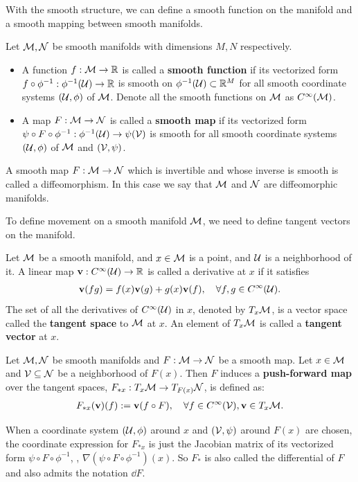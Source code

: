 With the smooth structure, we can define a smooth function on the manifold and a smooth mapping between smooth manifolds.
\begin{definition}
    Let $\mathcal{M},\mathcal{N}$ be smooth manifolds with dimensions $M,N$ respectively.
    \begin{itemize}
        \item A function $f:\mathcal{M}\to\mathbb{R}$ is called a \textbf{smooth function} if its vectorized form $f\circ\phi^{-1}:\phi^{-1}(\mathcal{U})\to\mathbb{R}$ is smooth on $\phi^{-1}(\mathcal{U})\subset\mathbb{R}^M$ for all smooth coordinate systems $(\mathcal{U},\phi)$ of $\mathcal{M}$. Denote all the smooth functions on $\mathcal{M}$ as $C^\infty(\mathcal{M})$.
        \item A map $F:\mathcal{M}\to\mathcal{N}$ is called a \textbf{smooth map} if its vectorized form $\psi\circ F\circ\phi^{-1}:\phi^{-1}(\mathcal{U})\to \psi(\mathcal{V})$ is smooth for all smooth coordinate systems $(\mathcal{U},\phi)$ of $\mathcal{M}$ and $(\mathcal{V},\psi)$.
    \end{itemize}
    A smooth map $F:\mathcal{M}\to\mathcal{N}$ which is invertible and whose inverse is smooth is called a diffeomorphism. In this case we say that $\mathcal{M}$ and $\mathcal{N}$ are diffeomorphic manifolds.
\end{definition}
To define movement on a smooth manifold $\mathcal{M}$, we need to define tangent vectors on the manifold.
\begin{definition}
    Let $\mathcal{M}$ be a smooth manifold, and $x\in\mathcal{M}$ is a point, and $\mathcal{U}$ is a neighborhood of it. A linear map $\mathbf{v}: C^\infty(\mathcal{U})\to\mathbb{R}$ is called a derivative at $x$ if it satisfies
    \begin{align}
        \mathbf{v}(fg) = f(x) \mathbf{v}(g) + g(x) \mathbf{v} (f), \quad \forall f,g \in C^\infty(\mathcal{U}).
    \end{align}
    The set of all the derivatives of $C^\infty(\mathcal{U})$ in $x$, denoted by $T_x \mathcal{M}$, is a vector space called the \textbf{tangent space} to $\mathcal{M}$ at $x$. An element of $T_x\mathcal{M}$ is called a \textbf{tangent vector} at $x$.
\end{definition}

\begin{definition}\label{def:tangent-map}
    Let $\mathcal{M},\mathcal{N}$ be smooth manifolds and $F:\mathcal{M}\to\mathcal{N}$ be a smooth map. Let $x \in \mathcal{M}$ and $\mathcal{V} \subseteq \mathcal{N}$ be a neighborhood of $F(x)$. Then $F$ induces a \textbf{push-forward map} over the tangent spaces, $F_{*x}: T_x\mathcal{M}\to T_{F(x)}\mathcal{N}$, is defined as:
    \begin{align}
        F_{*x}(\mathbf{v}) (f) := \mathbf{v}(f \circ F), \quad \forall f \in C^\infty(\mathcal{V}), \mathbf{v}\in T_x\mathcal{M}.
    \end{align}
\end{definition}
When a coordinate system $(\mathcal{U},\phi)$ around $x$ and $(\mathcal{V},\psi)$ around $F(x)$ are chosen, the coordinate expression for $F_{*x}$ is just the Jacobian matrix of its vectorized form $\psi \circ F \circ \phi^{-1}$, \ie, $\nabla (\psi \circ F \circ \phi^{-1})(x)$. So $F_*$ is also called the differential of $F$ and also admits the notation $\dd F$.

